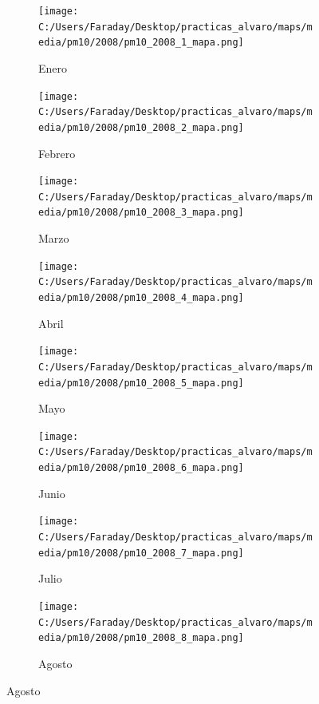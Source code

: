 \documentclass[12pt]{beamer}
\begin{document}
\begin{frame}[squeeze]
\tiny
\begin{figure}[H]
\centering
\begin{subfigure}[H]{0.20\textwidth}
\texttt{[image: C:/Users/Faraday/Desktop/practicas\_alvaro/maps/media/pm10/2008/pm10\_2008\_1\_mapa.png]}
\captionsetup{labelformat=empty}
\caption{\scriptsize Enero}
\label{fig:map-pm10-2008-1}
\end{subfigure}
%
\begin{subfigure}[H]{0.20\textwidth}
\texttt{[image: C:/Users/Faraday/Desktop/practicas\_alvaro/maps/media/pm10/2008/pm10\_2008\_2\_mapa.png]}
\captionsetup{labelformat=empty}
\caption{\scriptsize Febrero}
\label{fig:map-pm10-2008-2}
\end{subfigure}
%
\begin{subfigure}[H]{0.20\textwidth}
\texttt{[image: C:/Users/Faraday/Desktop/practicas\_alvaro/maps/media/pm10/2008/pm10\_2008\_3\_mapa.png]}
\captionsetup{labelformat=empty}
\caption{\scriptsize Marzo}
\label{fig:map-pm10-2008-3}
\end{subfigure}
%
\begin{subfigure}[H]{0.20\textwidth}
\texttt{[image: C:/Users/Faraday/Desktop/practicas\_alvaro/maps/media/pm10/2008/pm10\_2008\_4\_mapa.png]}
\captionsetup{labelformat=empty}
\caption{\scriptsize Abril}
\label{fig:map-pm10-2008-4}
\end{subfigure}

\begin{subfigure}[H]{0.20\textwidth}
\texttt{[image: C:/Users/Faraday/Desktop/practicas\_alvaro/maps/media/pm10/2008/pm10\_2008\_5\_mapa.png]}
\captionsetup{labelformat=empty}
\caption{\scriptsize Mayo}
\label{fig:map-pm10-2008-5}
\end{subfigure}
%
\begin{subfigure}[H]{0.20\textwidth}
\texttt{[image: C:/Users/Faraday/Desktop/practicas\_alvaro/maps/media/pm10/2008/pm10\_2008\_6\_mapa.png]}
\captionsetup{labelformat=empty}
\caption{\scriptsize Junio}
\label{fig:map-pm10-2008-6}
\end{subfigure}
%
\begin{subfigure}[H]{0.20\textwidth}
\texttt{[image: C:/Users/Faraday/Desktop/practicas\_alvaro/maps/media/pm10/2008/pm10\_2008\_7\_mapa.png]}
\captionsetup{labelformat=empty}
\caption{\scriptsize Julio}
\label{fig:map-pm10-2008-7}
\end{subfigure}
%
\begin{subfigure}[H]{0.20\textwidth}
\texttt{[image: C:/Users/Faraday/Desktop/practicas\_alvaro/maps/media/pm10/2008/pm10\_2008\_8\_mapa.png]}
\captionsetup{labelformat=empty}
\caption{\scriptsize Agosto}
\label{fig:map-pm10-2008-8}
\end{subfigure}


\end{figure}
\end{frame}
\end{document}
